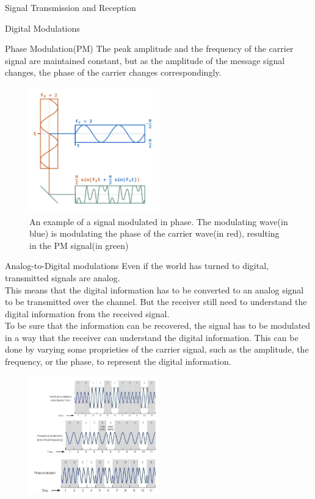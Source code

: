 \begin{section}{Signal Transmission and Reception}
\begin{subsection}{Digital Modulations}
\begin{subsubsection}{Phase Modulation(PM)}
      The peak amplitude and the frequency of the carrier signal are maintained constant, but as 
      the amplitude of the message signal changes, the phase of the carrier changes 
      correspondingly.\\
      \begin{figure}[h]
        \centering
        \includegraphics[width=0.5\textwidth]{img/wireless/PM.png}
        \caption{An example of a signal modulated in phase. The modulating wave(in blue) is modulating
          the phase of the carrier wave(in red), resulting in the PM signal(in green)}
        \label{fig:PM}
      \end{figure}
    \end{subsubsection}
    \begin{subsubsection}{Analog-to-Digital modulations}
      Even if the world has turned to digital, transmitted signals are analog.\\
      This means that the digital information has to be converted to an analog signal to be
      transmitted over the channel. But the receiver still need to understand the digital information
      from the received signal.\\
      To be sure that the information can be recovered, the signal has to be modulated in a way that
      the receiver can understand the digital information. This can be done by varying some proprieties
      of the carrier signal, such as the amplitude, the frequency, or the phase, to represent the
      digital information.\\
      \begin{figure}[h]
        \centering
        \includegraphics[width=0.5\textwidth]{img/wireless/modulation encoding.png}

\end{figure}
\end{subsubsection}
\end{subsection}
\end{section}

